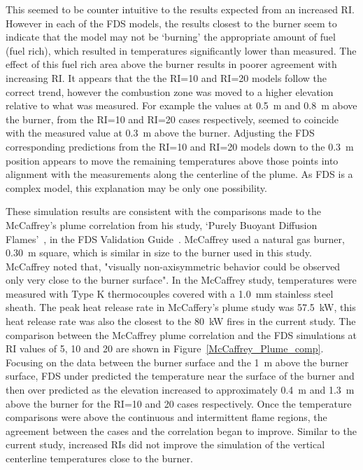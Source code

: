 \documentclass[twoside]{uocthesis}
\begin{document}
{This seemed to be counter intuitive to the results expected from an increased RI.  However in each of the FDS models, the results closest to the burner seem to indicate that the model may not be `burning' the appropriate amount of fuel (fuel rich), which resulted in temperatures significantly lower than measured.  The effect of this fuel rich area above the burner results in poorer agreement with increasing RI.  It appears that the the RI=10 and RI=20 models follow the correct trend, however the combustion zone was moved to a higher elevation relative to what was measured.  For example the values at 0.5~m and 0.8~m above the burner, from the RI=10 and RI=20 cases respectively, seemed to coincide with the measured value at 0.3~m above the burner.  Adjusting the FDS corresponding predictions from the RI=10 and RI=20 models down to the 0.3~m position appears to move the remaining temperatures above those points into alignment with the measurements along the centerline of the plume. As FDS is a complex model, this explanation may be only one possibility. 

These simulation results are consistent with the comparisons made to the McCaffrey's plume correlation from his study, `Purely Buoyant Diffusion Flames'~\cite{McCaffrey:1979}, in the FDS Validation Guide~\cite{FDS_Validation_Guide}. McCaffrey used a natural gas burner, 0.30~m square, which is similar in size to the burner used in this study.  McCaffrey noted that, "visually non-axisymmetric behavior could be observed only very close to the burner surface".  In the McCaffrey study, temperatures were measured with Type K thermocouples covered with a 1.0~mm stainless steel sheath. The peak heat release rate in McCaffery's plume study was 57.5~kW, this heat release rate was also the closest to the 80~kW fires in the current study.  The comparison between the McCaffrey plume correlation and the FDS simulations at RI values of 5, 10 and 20 are shown in Figure~\ref{McCaffrey_Plume_comp}. Focusing on the data between the burner surface and the 1~m above the burner surface, FDS under predicted the temperature near the surface of the burner and then over predicted as the elevation increased to approximately 0.4~m and 1.3~m above the burner for the RI=10 and 20 cases respectively. Once the temperature comparisons were above the continuous and intermittent flame regions, the agreement between the cases and the correlation began to improve.  Similar to the current study, increased RIs did not improve the simulation of the vertical centerline temperatures close to the burner.   

}
\end{document}

